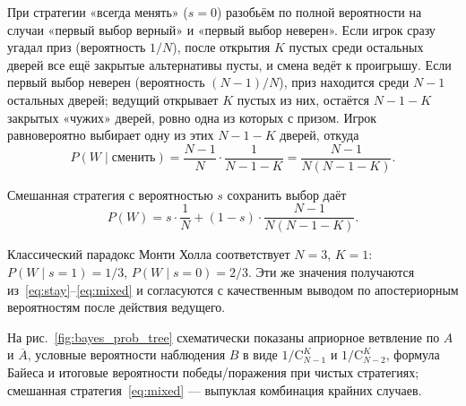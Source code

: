 \documentclass[a4paper, 14pt]{extarticle}
\begin{document}
При стратегии «всегда менять» ($s=0$) разобьём по полной вероятности на случаи «первый выбор верный» и «первый выбор неверен». Если игрок сразу угадал приз (вероятность $1/N$), после открытия $K$ пустых среди остальных дверей все ещё закрытые альтернативы пусты, и смена ведёт к проигрышу. Если первый выбор неверен (вероятность $(N-1)/N$), приз находится среди $N-1$ остальных дверей; ведущий открывает $K$ пустых из них, остаётся $N-1-K$ закрытых «чужих» дверей, ровно одна из которых с призом. Игрок равновероятно выбирает одну из этих $N-1-K$ дверей, откуда
\begin{equation}\label{eq:switch}
  P(W \mid \text{сменить}) = \frac{N-1}{N} \cdot \frac{1}{N-1-K} = \frac{N-1}{N(N-1-K)}.
\end{equation}

Смешанная стратегия с вероятностью $s$ сохранить выбор даёт
\begin{equation}\label{eq:mixed}
  P(W) = s \cdot \frac{1}{N} + (1-s) \cdot \frac{N-1}{N(N-1-K)}.
\end{equation}

Классический парадокс Монти Холла соответствует $N=3$, $K=1$: $P(W\mid s=1)=1/3$, $P(W\mid s=0)=2/3$. Эти же значения получаются из~\eqref{eq:stay}--\eqref{eq:mixed} и согласуются с качественным выводом по апостериорным вероятностям после действия ведущего.

На рис.~\ref{fig:bayes_prob_tree} схематически показаны априорное ветвление по $A$ и $\overline{A}$, условные вероятности наблюдения $B$ в виде $1/\mathrm{C}_{N-1}^{K}$ и $1/\mathrm{C}_{N-2}^{K}$, формула Байеса и итоговые вероятности победы/поражения при чистых стратегиях; смешанная стратегия~\eqref{eq:mixed} --- выпуклая комбинация крайних случаев.
\end{document}
